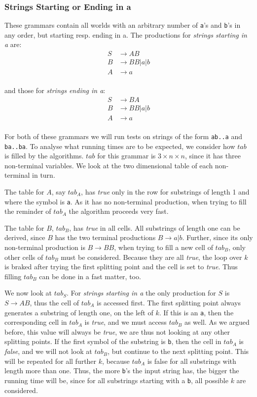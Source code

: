 \subsubsection{Strings Starting or Ending in a}
These grammars contain all worlds with an arbitrary number of \texttt{a}'s and \texttt{b}'s in any order, but starting resp. ending in a.
The productions for \textit{strings starting in a} are:
\begin{align*}
    S&\rightarrow AB\\
    B&\rightarrow BB|a|b\\
    A&\rightarrow a\\
\end{align*}

and those for \textit{strings ending in a}:
\begin{align*}
    S&\rightarrow BA\\
    B&\rightarrow BB|a|b\\
    A&\rightarrow a\\
\end{align*}

For both of these grammars we will run tests on strings of the form \texttt{ab..a} and \texttt{ba..ba}.
To analyse what running times are to be expected, we consider how $tab$ is filled by the algorithms.
$tab$ for this grammar is $3\times n\times n$, since it has three non-terminal variables.
We look at the two dimensional table of each non-terminal in turn.

The table for $A$, say $tab_A$, has \textit{true} only in the row for substrings of length 1 and where the symbol is \texttt{a}.
As it has no non-terminal production, when trying to fill the reminder of $tab_A$ the algorithm proceeds very fast.

The table for $B$, $tab_B$, has \textit{true} in all cells.
All substrings of length one can be derived, since $B$ has the two terminal productions $B\rightarrow a|b$.
Further, since its only non-terminal production is $B\rightarrow BB$, when trying to fill a new cell of $tab_B$, only other cells of $tab_B$ must be considered.
Because they are all \textit{true}, the loop over $k$ is braked after trying the first splitting point and the cell is set to \textit{true}.
Thus filling $tab_B$ can be done in a fast matter, too.

We now look at $tab_S$.
For \textit{strings starting in a} the only production for $S$ is $S\rightarrow AB$, thus the cell of $tab_A$ is accessed first.
The first splitting point always generates a substring of length one, on the left of $k$.
If this is an \texttt{a}, then the corresponding cell in $tab_A$ is \textit{true}, and we must access $tab_B$ as well.
As we argued before, this value will always be \textit{true}, we are thus not looking at any other splitting points.
If the first symbol of the substring is \texttt{b}, then the cell in $tab_A$ is \textit{false}, and we will not look at $tab_B$, but continue to the next splitting point.
This will be repeated for all further $k$, because $tab_A$ is false for all substrings with length more than one.
Thus, the more \texttt{b}'s the input string has, the bigger the running time will be, since for all substrings starting with a \texttt{b}, all possible $k$ are considered.


